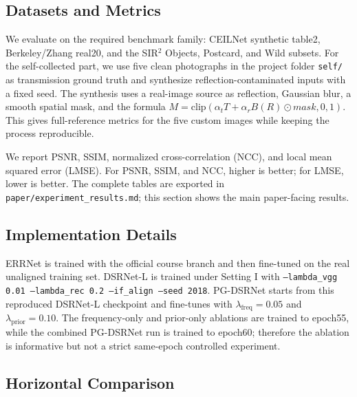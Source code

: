 \documentclass[10pt,twocolumn,letterpaper]{article}
\newcommand{\method}{PG-DSRNet\xspace}
\begin{document}
\subsection{Datasets and Metrics}
We evaluate on the required benchmark family: CEILNet synthetic table2, Berkeley/Zhang real20, and the SIR$^2$ Objects, Postcard, and Wild subsets.
For the self-collected part, we use five clean photographs in the project folder \texttt{self/} as transmission ground truth and synthesize reflection-contaminated inputs with a fixed seed.
The synthesis uses a real-image source as reflection, Gaussian blur, a smooth spatial mask, and the formula
$M=\mathrm{clip}(\alpha_t T+\alpha_r B(R)\odot mask,0,1)$.
This gives full-reference metrics for the five custom images while keeping the process reproducible.

We report PSNR, SSIM, normalized cross-correlation (NCC), and local mean squared error (LMSE).
For PSNR, SSIM, and NCC, higher is better; for LMSE, lower is better.
The complete tables are exported in \texttt{paper/experiment\_results.md}; this section shows the main paper-facing results.

\subsection{Implementation Details}
ERRNet is trained with the official course branch and then fine-tuned on the real unaligned training set.
DSRNet-L is trained under Setting I with \texttt{--lambda\_vgg 0.01 --lambda\_rec 0.2 --if\_align --seed 2018}.
\method starts from this reproduced DSRNet-L checkpoint and fine-tunes with $\lambda_{\mathrm{freq}}=0.05$ and $\lambda_{\mathrm{prior}}=0.10$.
The frequency-only and prior-only ablations are trained to epoch55, while the combined \method run is trained to epoch60; therefore the ablation is informative but not a strict same-epoch controlled experiment.

\subsection{Horizontal Comparison}
\end{document}
